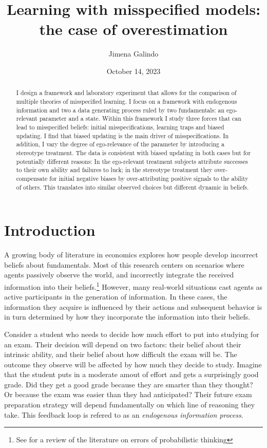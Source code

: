 \documentclass[
  12pt,
]{article}
\title{Learning with misspecified models: the case of overestimation}
\author{Jimena Galindo}
\date{October 14, 2023}
\begin{document}
\maketitle
\begin{abstract}
I design a framework and laboratory experiment that allows for the
comparison of multiple theories of misspecified learning. I focus on a
framework with endogenous information and two a data generating process
ruled by two fundamentals: an ego-relevant parameter and a state. Within
this framework I study three forces that can lead to misspecified
beliefs: initial misspecifications, learning traps and biased updating.
I find that biased updating is the main driver of misspecifications. In
addition, I vary the degree of ego-relevance of the parameter by
introducing a stereotype treatment. The data is consistent with biased
updating in both cases but for potentially different reasons: In the
ego-relevant treatment subjects attribute successes to their own ability
and failures to luck; in the stereotype treatment they over-compensate
for initial negative biases by over-attributing positive signals to the
ability of others. This translates into similar observed choices but
different dynamic in beliefs.
\end{abstract}

\newpage

\hypertarget{introduction}{%
\section{Introduction}\label{introduction}}

A growing body of literature in economics explores how people develop
incorrect beliefs about fundamentals. Most of this research centers on
scenarios where agents passively observe the world, and incorrectly
integrate the received information into their
beliefs.\footnote{See \citet{benjamin2019} for a review of the literature on errors of 
probabilistic thinking} However, many real-world situations cast agents
as active participants in the generation of information. In these cases,
the information they acquire is influenced by their actions and
subsequent behavior is in turn determined by how they incorporate the
information into their beliefs.

Consider a student who needs to decide how much effort to put into
studying for an exam. Their decision will depend on two factors: their
belief about their intrinsic ability, and their belief about how
difficult the exam will be. The outcome they observe will be affected by
how much they decide to study. Imagine that the student puts in a
moderate amout of effort and gets a surprisingly good grade. Did they
get a good grade because they are smarter than they thought? Or because
the exam was easier than they had anticipated? Their future exam
preparation strategy will depend fundamentally on which line of
reasoning they take. This feedback loop is refered to as an
\emph{endogenous information 
process}.
\end{document}
